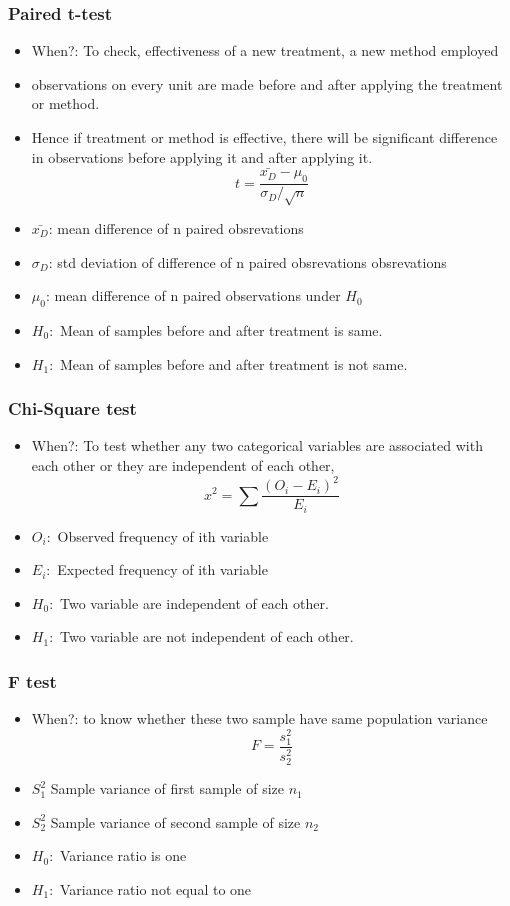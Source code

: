 \begin{frame}[fragile]\frametitle{Paired t-test}
\begin{itemize}
\item When?: To check, effectiveness of a new treatment, a new method 
employed 
\item  observations on  every  unit  are  made  before  and  after  applying  the  treatment  or 
method.  
\item Hence  if  treatment  or  method  is  effective,  there  will  be 
significant  difference  in  observations  before  applying  it  and  after 
applying it. 
$$
t = \frac{\bar{x_D} - \mu_0}{\sigma_D /\sqrt{n}}
$$
\item $\bar{x_D}$: mean difference of n paired obsrevations
\item $\sigma_D$:  std deviation of difference of n paired obsrevations obsrevations
\item $\mu_0$: mean difference of n paired observations under $H_0$
\item $H_0: $ Mean of samples before and after treatment is same. 
\item $H_1:$ Mean of samples before and after treatment is not same.
\end{itemize}
\end{frame}


\begin{frame}[fragile]\frametitle{Chi-Square test}
\begin{itemize}
\item When?: To test whether any 
two  categorical variables  are  associated  with  each  other  or  they  are 
independent  of  each  other,
$$
x^2= \sum \frac{(O_i - E_i)^2}{E_i}
$$
\item $O_i:$ Observed frequency of ith variable
\item $E_i:$ Expected frequency of ith variable
\item $H_0: $ Two variable are independent of each other. 
\item $H_1:$ Two variable are not independent of each other. 
\end{itemize}
\end{frame}

\begin{frame}[fragile]\frametitle{F test}
\begin{itemize}
\item When?: to  know 
whether  these  two  sample  have  same  population  variance
$$
F = \frac{s_1^2}{s_2^2}
$$
\item $S_1^2$ Sample variance of first sample of size $n_1$
\item $S_2^2$ Sample variance of second sample of size $n_2$
\item $H_0: $ Variance ratio is one
\item $H_1:$ Variance ratio not equal to one
\end{itemize}
\end{frame}


